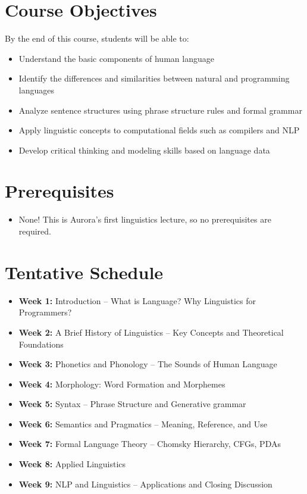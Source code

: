 \documentclass[12pt,oneside,a4paper]{oblivoir}
\begin{document}
\section*{Course Objectives}

By the end of this course, students will be able to:

\begin{itemize}
    \item Understand the basic components of human language
    \item Identify the differences and similarities between natural and programming languages
    \item Analyze sentence structures using phrase structure rules and formal grammar
    \item Apply linguistic concepts to computational fields such as compilers and NLP
    \item Develop critical thinking and modeling skills based on language data
\end{itemize}

\section*{Prerequisites}
\begin{itemize}
    \item None! This is Aurora's first linguistics lecture, so no prerequisites are required.
\end{itemize}

\section*{Tentative Schedule}

\begin{itemize}
    \item \textbf{Week 1:} Introduction – What is Language? Why Linguistics for Programmers?
    \item \textbf{Week 2:} A Brief History of Linguistics – Key Concepts and Theoretical Foundations
    \item \textbf{Week 3:} Phonetics and Phonology – The Sounds of Human Language
    \item \textbf{Week 4:} Morphology: Word Formation and Morphemes
    \item \textbf{Week 5:} Syntax – Phrase Structure and Generative grammar
    \item \textbf{Week 6:} Semantics and Pragmatics – Meaning, Reference, and Use
    \item \textbf{Week 7:} Formal Language Theory – Chomsky Hierarchy, CFGs, PDAs
    \item \textbf{Week 8:} Applied Linguistics
    \item \textbf{Week 9:} NLP and Linguistics – Applications and Closing Discussion
\end{itemize}
\end{document}
